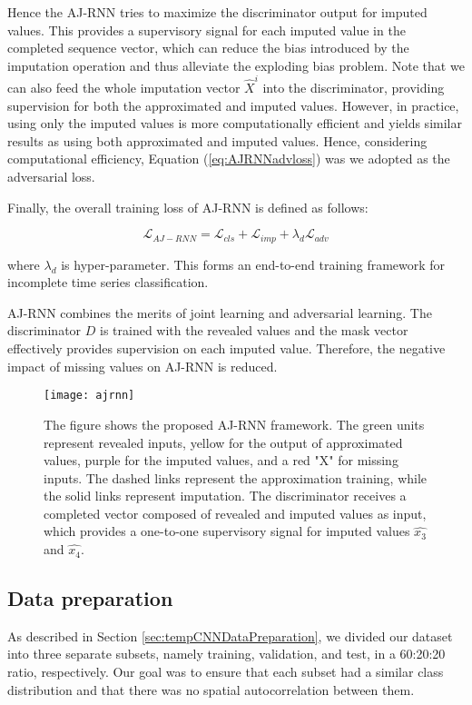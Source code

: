 Hence the AJ-RNN tries to maximize the discriminator output for imputed values.
This provides a supervisory signal for each imputed value in the completed sequence vector, which can reduce the bias introduced by the imputation operation and thus alleviate the exploding bias problem.
Note that we can also feed the whole imputation vector $\hat{X}^i$ into the discriminator, providing supervision for both the approximated and imputed values. 
However, in practice, using only the imputed values is more computationally efficient and yields similar results as using both approximated and imputed values. 
Hence, considering computational efficiency, Equation (\ref{eq:AJRNNadvloss}) was we adopted as the adversarial loss.

Finally, the overall training loss of AJ-RNN is defined as follows:

\begin{equation}
  \mathcal{L}_{AJ-RNN} = \mathcal{L}_{cls} + \mathcal{L}_{imp} + \lambda_d \mathcal{L}_{adv}
  \label{eq:AJRNNloss}
\end{equation}

where $\lambda_d$ is hyper-parameter. 
This forms an end-to-end training framework for incomplete time series classification.

AJ-RNN combines the merits of joint learning and adversarial learning.
The discriminator $D$ is trained with the revealed values and the mask vector effectively provides supervision on each imputed value. 
Therefore, the negative impact of missing values on AJ-RNN is reduced.

\begin{figure}[H]
  \centering
  \texttt{[image: ajrnn]}
  \caption{The figure shows the proposed AJ-RNN framework. The green units represent revealed inputs, yellow for the output of approximated values, purple for the imputed values, and a red "X" for missing inputs. The dashed links represent the approximation training, while the solid links represent imputation. The discriminator receives a completed vector composed of revealed and imputed values as input, which provides a one-to-one supervisory signal for imputed values $\hat{x_3}$ and $\hat{x_4}$.}
  \label{fig:AJRNNrchitecture}
\end{figure}

\subsection{Data preparation}
As described in Section \ref{sec:tempCNNDataPreparation}, we divided our dataset into three separate subsets, namely training, validation, and test, in a 60:20:20 ratio, respectively. 
Our goal was to ensure that each subset had a similar class distribution and that there was no spatial autocorrelation between them.


